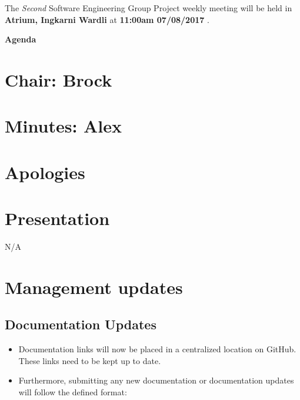 \documentclass[11pt, a4paper]{article}
\newcommand{\meetingno}{ Second }
\newcommand{\meetinglocation}{ Atrium, Ingkarni Wardli } %
\newcommand{\meetingdatetime}{ 11:00am 07/08/2017 } %
\newcommand{\meetingchair}{ Brock } %
\newcommand{\meetingminutes}{ Alex }
\begin{document}
  \noindent The {\em \meetingno} Software Engineering Group Project weekly meeting will be held in {\bf \meetinglocation } at {\bf \meetingdatetime }.

  \vspace*{15pt}

  \begin{center}
  \huge \bf Agenda
  \end{center}

  \begin{flushleft}
  
  \section*{Chair: \meetingchair }
  \section*{Minutes: \meetingminutes }
  

  \vspace*{10pt}

  \section{Apologies}

  \section{Presentation}
  N/A
  
  \section{Management updates}
  \subsection{Documentation Updates}
  \begin{itemize}
  \item Documentation links will now be placed in a centralized location on GitHub. These links need to be kept up to date.
  \item Furthermore, submitting any new documentation or documentation updates will follow the defined format:
  \begin{enumerate}


\end{enumerate}
\end{itemize}
\end{flushleft}
\end{document}
